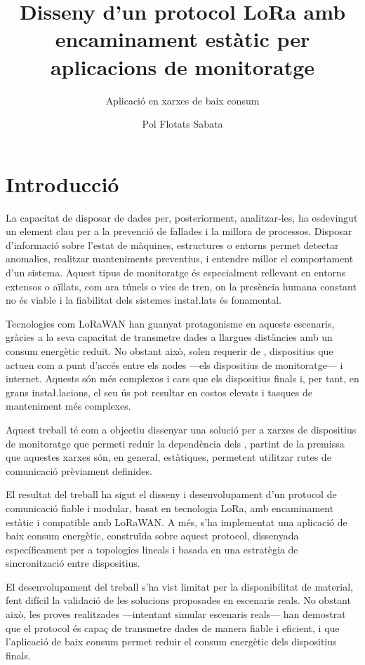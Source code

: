\documentclass{tfgitic}[2024/07/01]
\title{Disseny d'un protocol LoRa amb encaminament estàtic per aplicacions de monitoratge}
\subtitle{Aplicació en xarxes de baix consum}
\author{Pol Flotats Sabata}
\begin{document}
\listoffigures

\chapter{Introducció}

La capacitat de disposar de dades per, posteriorment, analitzar-les, ha esdevingut un element clau per a la prevenció de fallades i la millora de processos. Disposar d'informació sobre l'estat de màquines, estructures o entorns permet detectar anomalies, realitzar manteniments preventius, i entendre millor el comportament d'un sistema. Aquest tipus de monitoratge és especialment rellevant en entorns extensos o aïllats, com ara túnels o vies de tren, on la presència humana constant no és viable i la fiabilitat dels sistemes insta\l.lats és fonamental.

Tecnologies com LoRaWAN han guanyat protagonisme en aquests escenaris, gràcies a la seva capacitat de transmetre dades a llargues distàncies amb un consum energètic reduït. No obstant això, solen requerir de , dispositius que actuen com a punt d'accés entre els nodes ---els dispositius de monitoratge--- i internet. Aquests  són més complexos i cars que els dispositius finals i, per tant, en grans insta\l.lacions, el seu ús pot resultar en costos elevats i tasques de manteniment més complexes.

Aquest treball té com a objectiu dissenyar una solució per a xarxes de dispositius de monitoratge que permeti reduir la dependència dels , partint de la premissa que aquestes xarxes són, en general, estàtiques, permetent utilitzar rutes de comunicació prèviament definides. 

El resultat del treball ha sigut el disseny i desenvolupament d'un protocol de comunicació fiable i modular, basat en tecnologia LoRa, amb encaminament estàtic i compatible amb LoRaWAN. A més, s'ha implementat una aplicació de baix consum energètic, construïda sobre aquest protocol, dissenyada específicament per a topologies lineals i basada en una estratègia de sincronització entre dispositius. 

El desenvolupament del treball s'ha vist limitat per la disponibilitat de material, fent difícil la validació de les solucions proposades en escenaris reals. No obstant això, les proves realitzades ---intentant simular escenaris reals--- han demostrat que el protocol és capaç de transmetre dades de manera fiable i eficient, i que l'aplicació de baix consum permet reduir el consum energètic dels dispositius finals.
\end{document}
